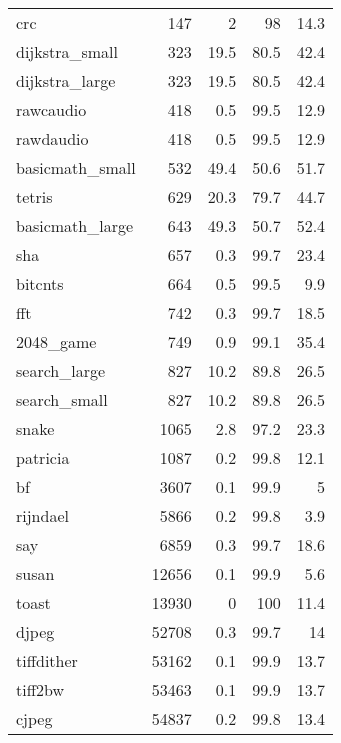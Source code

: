 \begin{tabular}{lrrrr}
 crc             &     147 &    2   &         98   &    14.3 \\
 dijkstra\_small  &     323 &   19.5 &         80.5 &    42.4 \\
 dijkstra\_large  &     323 &   19.5 &         80.5 &    42.4 \\
 rawcaudio       &     418 &    0.5 &         99.5 &    12.9 \\
 rawdaudio       &     418 &    0.5 &         99.5 &    12.9 \\
 basicmath\_small &     532 &   49.4 &         50.6 &    51.7 \\
 tetris          &     629 &   20.3 &         79.7 &    44.7 \\
 basicmath\_large &     643 &   49.3 &         50.7 &    52.4 \\
 sha             &     657 &    0.3 &         99.7 &    23.4 \\
 bitcnts         &     664 &    0.5 &         99.5 &     9.9 \\
 fft             &     742 &    0.3 &         99.7 &    18.5 \\
 2048\_game       &     749 &    0.9 &         99.1 &    35.4 \\
 search\_large    &     827 &   10.2 &         89.8 &    26.5 \\
 search\_small    &     827 &   10.2 &         89.8 &    26.5 \\
 snake           &    1065 &    2.8 &         97.2 &    23.3 \\
 patricia        &    1087 &    0.2 &         99.8 &    12.1 \\
 bf              &    3607 &    0.1 &         99.9 &     5   \\
 rijndael        &    5866 &    0.2 &         99.8 &     3.9 \\
 say             &    6859 &    0.3 &         99.7 &    18.6 \\
 susan           &   12656 &    0.1 &         99.9 &     5.6 \\
 toast           &   13930 &    0   &        100   &    11.4 \\
 djpeg           &   52708 &    0.3 &         99.7 &    14   \\
 tiffdither      &   53162 &    0.1 &         99.9 &    13.7 \\
 tiff2bw         &   53463 &    0.1 &         99.9 &    13.7 \\
 cjpeg           &   54837 &    0.2 &         99.8 &    13.4 \\

\end{tabular}
